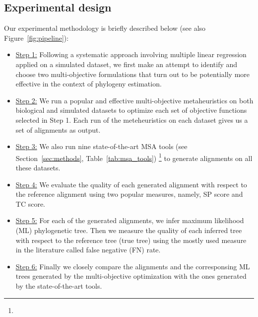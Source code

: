 \subsection{Experimental design}
Our experimental methodology is briefly described below (see also Figure~\ref{fig:pipeline}):
\begin{itemize}
	\item \underline{Step 1:} Following a systematic approach involving multiple linear regression applied on a simulated dataset, we first make an attempt to identify and choose two multi-objective formulations that turn out to be potentially more effective in the context of phylogeny estimation. 
	\item \underline{Step 2:} We run a popular and effective multi-objective metaheuristics on both biological and simulated datasets to optimize each set of objective functions selected in Step 1. Each run of the meteheuristics on each dataset gives us a set of alignments as output. 
	\item \underline{Step 3:} We also run nine state-of-the-art MSA tools (see Section~\ref{sec:methods}, Table~\ref{tab:msa_tools}) \footnote{} to generate alignments on all these datasets.
	\item \underline{Step 4:} We evaluate the quality of each generated alignment with respect to the reference alignment using two popular measures, namely, SP score and TC score. 
	\item \underline{Step 5:} For each of the generated alignments, we infer maximum likelihood (ML) phylogenetic tree. Then we measure the quality of each inferred tree with respect to the reference tree (true tree) using the mostly used measure in the literature called false negative (FN) rate.
	\item \underline{Step 6:} Finally we closely compare the alignments and the corresponsing ML trees generated by the multi-objective optimization with the ones generated by the state-of-the-art tools. %
\end{itemize}


